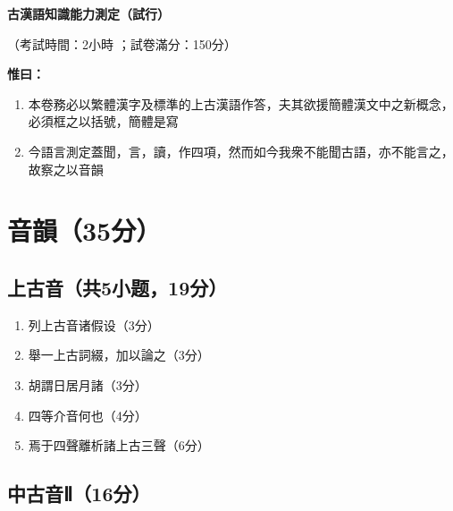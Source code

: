 \documentclass[12pt,a4paper]{article}
\begin{document}
\begin{center}
    \LARGE\textbf{古漢語知識能力測定（試行）}
    
    \vspace{1em}
    
    \large（考試時間：2小時 ；試卷滿分：150分）
\end{center}

\vspace{2em}

\noindent\textbf{惟曰：}
\begin{enumerate}[leftmargin=*, itemsep=0.5ex]
    \item 本卷務必以繁體漢字及標準的上古漢語作答，夫其欲援簡體漢文中之新概念，必須框之以括號，簡體是寫
    \item 今語言測定蓋聞，言，讀，作四項，然而如今我衆不能聞古語，亦不能言之，故察之以音韻
\end{enumerate}

\vspace{2em}

\section{音韻（35分）}

\subsection{上古音（共5小题，19分）}

\vspace{1em}

\begin{enumerate}[leftmargin=*, label=\textbf{\arabic*.}]
    \item 列上古音诸假设（3分）
    

    \item 舉一上古詞綴，加以論之（3分）
    
   
    \item 胡謂日居月諸（3分）
 
    
    \item 四等介音何也（4分）
    
    \vspace{8em}
    
    \item 焉于四聲離析諸上古三聲（6分）
    
    \vspace{10em}
\end{enumerate}

\subsection{中古音Ⅱ（16分）}
\end{document}
